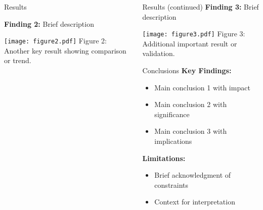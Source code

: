 \documentclass[final,t]{beamer}
\begin{document}
\begin{frame}[t]
\begin{columns}[t]
\begin{column}{.3\linewidth}
\begin{block}{Results}
        \vspace{1cm}
        
        \textbf{Finding 2:} Brief description
        
        \begin{center}
          \texttt{[image: figure2.pdf]}
          \small Figure 2: Another key result showing comparison or trend.
        \end{center}
      \end{block}
      
    \end{column}
    
    \begin{column}{.3\linewidth}
      
      \begin{block}{Results (continued)}
        \textbf{Finding 3:} Brief description
        
        \begin{center}
          \texttt{[image: figure3.pdf]}
          \small Figure 3: Additional important result or validation.
        \end{center}
      \end{block}
      
      \vspace{1cm}
      
      \begin{block}{Conclusions}
        \textbf{Key Findings:}
        \begin{itemize}
          \item Main conclusion 1 with impact
          \item Main conclusion 2 with significance
          \item Main conclusion 3 with implications
        \end{itemize}
        
        \vspace{0.5cm}
        
        \textbf{Limitations:}
        \begin{itemize}
          \item Brief acknowledgment of constraints
          \item Context for interpretation
        \end{itemize}
        

\end{block}
\end{column}
\end{columns}
\end{frame}
\end{document}
